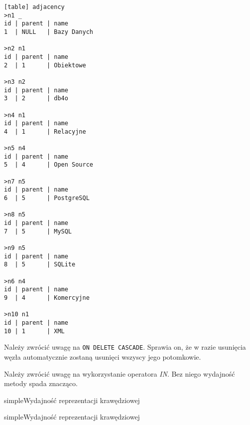 
\begin{verbatim}[table] adjacency
>n1 _
id | parent | name
1  | NULL   | Bazy Danych

>n2 n1
id | parent | name
2  | 1      | Obiektowe

>n3 n2
id | parent | name
3  | 2      | db4o

>n4 n1
id | parent | name
4  | 1      | Relacyjne

>n5 n4
id | parent | name
5  | 4      | Open Source

>n7 n5
id | parent | name
6  | 5      | PostgreSQL

>n8 n5
id | parent | name
7  | 5      | MySQL

>n9 n5
id | parent | name
8  | 5      | SQLite

>n6 n4
id | parent | name
9  | 4      | Komercyjne

>n10 n1
id | parent | name
10 | 1      | XML

\end{verbatim}


\vspace{-0.5cm}

\vspace{-0.5cm}

Należy zwrócić uwagę na  \texttt{ON DELETE CASCADE}. 
Sprawia on, że w razie usunięcia węzła  
automatycznie zostaną usunięci wszyscy jego potomkowie.








Należy zwrócić uwagę na wykorzystanie operatora \emph{IN}. Bez niego wydajność metody spada znacząco. 


\begin{qxtab}{simple}{Wydajność reprezentacji krawędziowej}
\end{qxtab}

\begin{qxfig}{simple}{Wydajność reprezentacji krawędziowej}
\end{qxfig}

